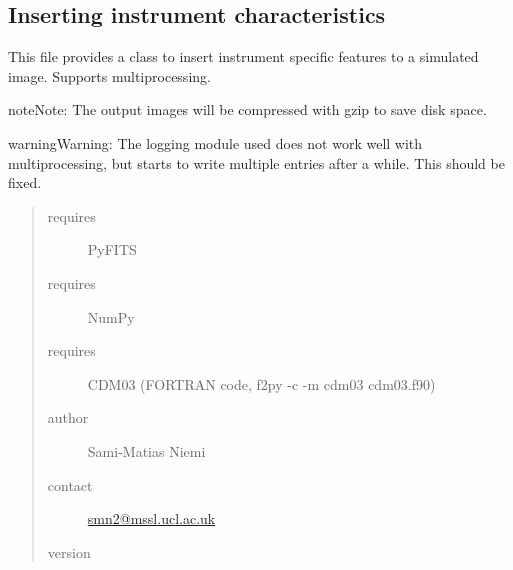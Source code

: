 \documentclass[a4paper,12pt,english]{sphinxmanual}
\begin{document}
\subsection{Inserting instrument characteristics}
\label{postproc:inserting-instrument-characteristics}
This file provides a class to insert instrument specific features to a simulated image. Supports multiprocessing.

\begin{notice}{note}{Note:}
The output images will be compressed with gzip to save disk space.
\end{notice}

\begin{notice}{warning}{Warning:}
The logging module used does not work well with multiprocessing, but
starts to write multiple entries after a while. This should be fixed.
\end{notice}
\begin{quote}\begin{description}
\item[{requires}] \leavevmode
PyFITS

\item[{requires}] \leavevmode
NumPy

\item[{requires}] \leavevmode
CDM03 (FORTRAN code, f2py -c -m cdm03 cdm03.f90)

\item[{author}] \leavevmode
Sami-Matias Niemi

\item[{contact}] \leavevmode
\href{mailto:smn2@mssl.ucl.ac.uk}{smn2@mssl.ucl.ac.uk}

\item[{version}] 

\end{description}\end{quote}
\end{document}
